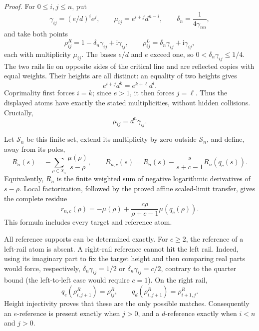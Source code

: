 \emph{Proof.}
For \(0\le i,j\le n\), put
\[
 \gamma_{ij}=(e/d)^i e^j,\qquad
 \mu_{ij}=e^{i+j}d^{n-i},\qquad
 \delta_n=\frac1{4\gamma_{nn}},
\]
and take both points
\[
 \rho^R_{ij}=1-\delta_n\gamma_{ij}+\mathrm i\gamma_{ij},
 \qquad
 \rho^L_{ij}=\delta_n\gamma_{ij}+\mathrm i\gamma_{ij},
\]
each with multiplicity \(\mu_{ij}\).
The bases \(e/d\) and \(e\) exceed one, so
\(0<\delta_n\gamma_{ij}\le1/4\). The two rails lie on opposite
sides of the critical line and are reflected copies with equal weights.
Their heights are all distinct: an equality of two heights gives
\[
 e^{i+j}d^k=e^{k+\ell}d^i.
\]
Coprimality first forces \(i=k\); since \(e>1\), it then forces
\(j=\ell\). Thus the displayed atoms have exactly the stated
multiplicities, without hidden collisions. Crucially,
\begin{equation}\label{eq:coprime-grid-linear-weight}
 \mu_{ij}=d^n\gamma_{ij}.
\end{equation}

Let \(\mathcal S_n\) be this finite set, extend its multiplicity by zero
outside \(\mathcal S_n\), and define, away from its poles,
\[
 R_n(s)=-\sum_{\rho\in\mathcal S_n}
                  \frac{\mu(\rho)}{s-\rho},
 \qquad
 R_{n,c}(s)=R_n(s)-\frac{s}{s+c-1}R_n(q_c(s)).
\]
Equivalently, \(R_n\) is the finite weighted sum of negative logarithmic
derivatives of \(s-\rho\). Local factorization, followed by the proved
affine scaled-limit transfer, gives the complete residue
\begin{equation}\label{eq:coprime-model-residue}
 r_{n,c}(\rho)=
 -\mu(\rho)+\frac{c\rho}{\rho+c-1}\mu(q_c(\rho)).
\end{equation}
This formula includes every target and reference atom.

All reference supports can be determined exactly. For \(c\ge2\), the
reference of a left-rail atom is absent. A right-rail reference cannot
hit the left rail. Indeed, using its imaginary part to fix the target
height and then comparing real parts would force, respectively,
\(\delta_n\gamma_{ij}=1/2\) or
\(\delta_n\gamma_{ij}=c/2\), contrary to the quarter bound
(the left-to-left case would require \(c=1\)).
On the right rail,
\[
 q_e(\rho^R_{i,j+1})=\rho^R_{ij},\qquad
 q_d(\rho^R_{i,j+1})=\rho^R_{i+1,j}.
\]
Height injectivity proves that these are the only possible matches.
Consequently an \(e\)-reference is present exactly when \(j>0\),
and a \(d\)-reference exactly when \(i<n\) and \(j>0\).

